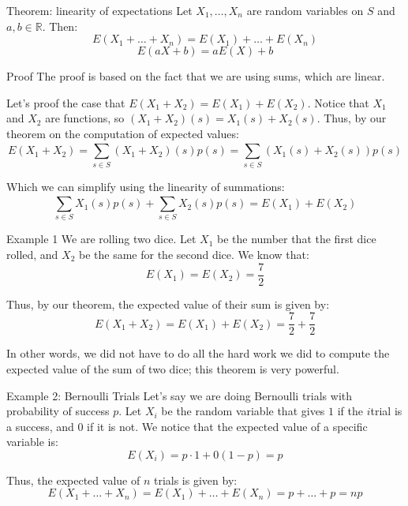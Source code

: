 \documentclass[a4paper]{article}
\begin{document}
\begin{parag}{Theorem: linearity of expectations}
    Let $X_1, \ldots, X_n$ are random variables on $S$ and $a, b \in \mathbb{R}$. Then:  
    \[E\left(X_1 + \ldots + X_n\right) = E\left(X_1\right) + \ldots + E\left(X_n\right)\]
    \[E\left(aX + b\right) = aE\left(X\right) + b\]
    
    \begin{subparag}{Proof}
        The proof is based on the fact that we are using sums, which are linear.

        Let's proof the case that $E\left(X_1 + X_2\right) = E\left(X_1\right) + E\left(X_2\right)$. Notice that $X_1$ and $X_2$ are functions, so $\left(X_1 + X_2\right)\left(s\right) = X_1\left(s\right) + X_2\left(s\right)$. Thus, by our theorem on the computation of expected values:
        \[E\left(X_1 + X_2\right) = \sum_{s \in S}^{} \left(X_1 + X_2\right)\left(s\right)p\left(s\right) = \sum_{s \in S}^{} \left(X_1\left(s\right) + X_2\left(s\right)\right)p\left(s\right)\]

        Which we can simplify using the linearity of summations: 
        \[\sum_{s \in S}^{} X_1\left(s\right)p\left(s\right) + \sum_{s \in S}^{} X_2\left(s\right)p\left(s\right) = E\left(X_1\right) + E\left(X_2\right)\]
        
    \end{subparag}
\end{parag}

\begin{parag}{Example 1}
    We are rolling two dice. Let $X_1$ be the number that the first dice rolled, and $X_2$ be the same for the second dice. We know that: 
    \[E\left(X_1\right) = E\left(X_2\right) = \frac{7}{2}\]
    
    Thus, by our theorem, the expected value of their sum is given by: 
    \[E\left(X_1 + X_2\right) = E\left(X_1\right) + E\left(X_2\right) = \frac{7}{2} + \frac{7}{2}\]

    In other words, we did not have to do all the hard work we did to compute the expected value of the sum of two dice; this theorem is very powerful.
\end{parag}

\begin{parag}{Example 2: Bernoulli Trials}
    Let's say we are doing Bernoulli trials with probability of success $p$. Let $X_i$ be the random variable that gives $1$ if the $i$\Th trial is a success, and $0$ if it is not. We notice that the expected value of a specific variable is: 
    \[E\left(X_i\right) = p\cdot 1 + 0\left(1 - p\right) = p\]
    
    Thus, the expected value of $n$ trials is given by: 
    \[E\left(X_1 + \ldots + X_n\right) = E\left(X_1\right) + \ldots + E\left(X_n\right) = p + \ldots + p = np\]
    
\end{parag}
\end{document}
